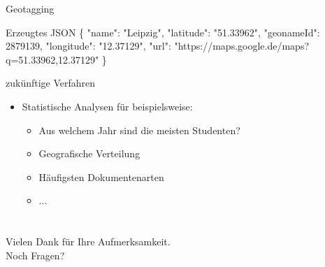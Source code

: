 \documentclass[12pt]{beamer}
\begin{document}
\begin{large}
\begin{frame}{Geotagging}
 \begin{block}{Erzeugtes JSON}
 \normalsize 
\{ \hspace*{0.17cm}"{}name"{}: "{}Leipzig"{},
 \newline
 \hspace*{0.5cm}"{}latitude"{}: "{}51.33962"{},
 \newline
 \hspace*{0.5cm}"{}geonameId"{}: 2879139,
 \newline
 \hspace*{0.5cm}"{}longitude"{}: "{}12.37129"{},
 \newline
 \hspace*{0.5cm}"{}url"{}: 
 \hspace*{0.5cm}"{}https://maps.google.de/maps?q=51.33962,12.37129"{}
 \hspace*{0.17cm}\}
 \end{block}
\end{frame}
 

\begin{frame}{zukünftige Verfahren}
 \begin{itemize}
   \item Statistische Analysen für beispielsweise:
   \begin{itemize}
   \normalsize
    \item Aus welchem Jahr sind die meisten Studenten?
    \item Geografische Verteilung
    \item Häufigsten Dokumentenarten
    \item ...
   \end{itemize}
 \end{itemize}
\end{frame}


\section*{}
\begin{frame}
\centering
{\Large Vielen Dank für Ihre Aufmerksamkeit. \\ Noch Fragen?}
\end{frame}

\end{large}
\end{document}
